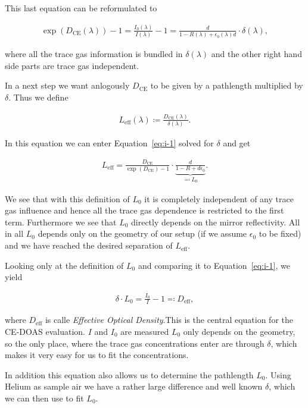 This last equation can be reformulated to

\begin{align}
  \exp(D_{\text{CE}}(\lambda)) - 1 = \frac{I_0(\lambda)}{I(\lambda)} -
  1 = \frac{d}{1 - R(\lambda) + \epsilon_0(\lambda) d} \cdot
  \delta(\lambda)\label{eq:i-1}, 
\end{align}

where all the trace gas information is bundled in $\delta(\lambda)$
and the other right hand side parts are trace gas independent.

In a next step we want anlogously $D_{\text{CE}}$ to be given by a
pathlength multiplied by $\delta$. Thus we define

\begin{align}
  L_{\text{eff}}(\lambda) \coloneqq \frac{D_{\text{CE}}(\lambda)}{\delta(\lambda)}.
\end{align}

In this equation we can enter Equation~\ref{eq:i-1} solved for
$\delta$ and get

\begin{align}
  L_{\text{eff}} = \frac{D_{\text{CE}}}{\exp(D_{\text{CE}}) - 1} \cdot
  \underbrace{\frac{d}{1 - R + d\epsilon_0}}_{\eqqcolon L_0}.
\end{align}

We see that with this definition of $L_0$ it is completely independent
of any trace gas influence and hence all the trace gas dependence is
restricted to the first term. Furthermore we see that $L_0$ directly
depends on the mirror reflectivity. All in all $L_0$ depends only on
the geometry of our setup (if we assume $\epsilon_0$ to be fixed) and
we have reached the desired separation of $L_{\text{eff}}$.

Looking only at the definition of $L_0$ and comparing it to
Equation~\eqref{eq:i-1}, we yield

\begin{align}
  \delta \cdot L_0 = \frac{I_0}{I} - 1 \eqqcolon D_{\text{eff}}, \label{eq:ce-central}
\end{align}

where $D_{\text{eff}}$ is calle \emph{Effective Optical Density}.This
is the central equation for the CE-DOAS evaluation. $I$ and $I_0$ are
measured $L_0$ only depends on the geometry, so the only place, where
the trace gas concentrations enter are through $\delta$, which makes
it very easy for us to fit the concentrations.

In addition this equation also allows us to determine the pathlength
$L_0$. Using Helium as sample air we have a rather large difference
and well known $\delta$, which we can then use to fit
$L_0$.

